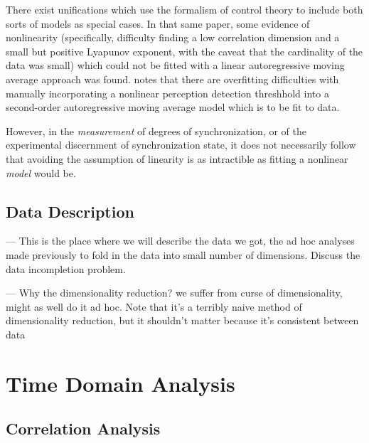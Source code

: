 \documentclass[12pt]{article}
\begin{document}
There exist unifications \cite{pressing} which use the formalism of control theory to include both sorts of models as special cases. In that same paper, some evidence of nonlinearity (specifically, difficulty finding a low correlation dimension and a small but positive Lyapunov exponent, with the caveat that the cardinality of the data was small) which could not be fitted with a linear autoregressive moving average approach was found. \cite{schulze} notes that there are overfitting difficulties with manually incorporating a nonlinear perception detection threshhold into a second-order autoregressive moving average model which is to be fit to data.

However, in the \emph{measurement} of degrees of synchronization, or of the experimental discernment of synchronization state, it does not necessarily follow that avoiding the assumption of linearity is as intractible as fitting a nonlinear \emph{model} would be.

\subsection{Data Description}

--- This is the place where we will describe the data we got, the ad hoc analyses made previously to fold in the data into small number of dimensions. Discuss the data incompletion problem.

--- Why the dimensionality reduction? we suffer from curse of dimensionality, might as well do it ad hoc. Note that it's a terribly naive method of dimensionality reduction, but it shouldn't matter because it's consistent between data

\section{Time Domain Analysis}

\subsection{Correlation Analysis}

\end{document}
